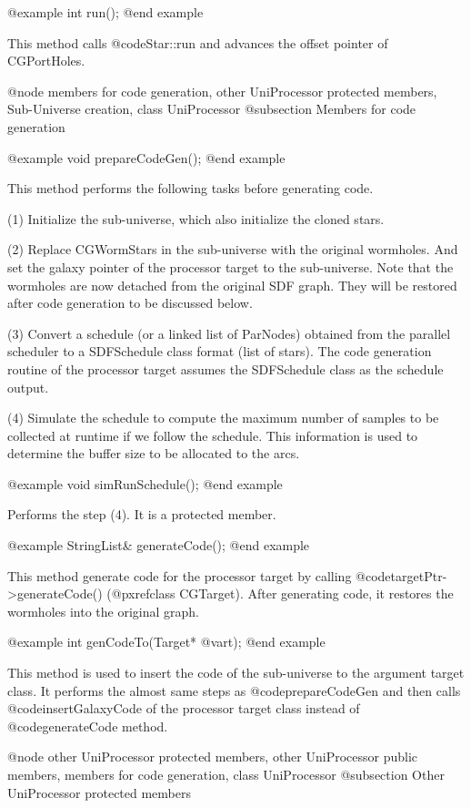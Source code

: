 @example
int run();
@end example

This method calls @code{Star::run} and advances the offset pointer of
CGPortHoles.

@node members for code generation, other UniProcessor protected members, Sub-Universe creation, class UniProcessor
@subsection Members for code generation

@example
void prepareCodeGen();
@end example

This method performs the following tasks before generating code.

(1) Initialize the sub-universe, which also initialize the cloned stars.

(2) Replace CGWormStars in the sub-universe with the original wormholes.
And set the galaxy pointer of the processor target to the sub-universe.
Note that the wormholes are now detached from the original SDF graph.
They will be restored after code generation to be discussed below.

(3) Convert a schedule (or a linked list of ParNodes) obtained from the
parallel scheduler to a SDFSchedule class format (list of stars). The
code generation routine of the processor target assumes the SDFSchedule
class as the schedule output.

(4) Simulate the schedule to compute the maximum number of samples
to be collected at runtime if we follow the schedule. This information
is used to determine the buffer size to be allocated to the arcs.

@example
void simRunSchedule();
@end example

Performs the step (4). It is a protected member.

@example
StringList& generateCode();
@end example

This method generate code for the processor target by calling
@code{targetPtr->generateCode()} (@pxref{class CGTarget}).
After generating code, it
restores the wormholes into the original graph.

@example
int genCodeTo(Target* @var{t});
@end example

This method is used to insert the code of the sub-universe to the
argument target class. It performs the almost same steps as
@code{prepareCodeGen} and then calls @code{insertGalaxyCode}
of the processor target class instead of @code{generateCode} method.

@node other UniProcessor protected members, other UniProcessor public members, members for code generation, class UniProcessor
@subsection Other UniProcessor protected members

